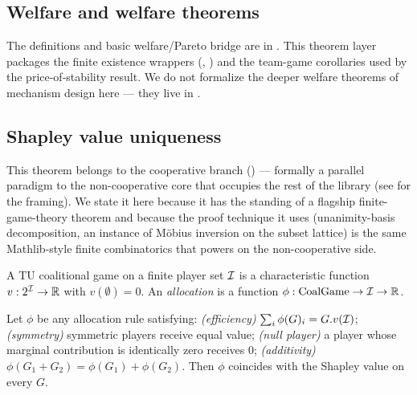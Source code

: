 \subsection{Welfare and welfare theorems}
\label{sec:theorems:welfare}

The definitions and basic welfare/Pareto bridge are in
.  This theorem layer packages
the finite existence wrappers
(, ) and the
team-game corollaries used by the price-of-stability result.  We do
not formalize the deeper welfare theorems of mechanism design here
— they live in .


\subsection{Shapley value uniqueness}
\label{sec:theorems:shapley-uniqueness}

This theorem belongs to the cooperative branch
() — formally a parallel
paradigm to the non-cooperative core that occupies the rest of
the library (see  for the framing).
We state it here because it has the standing of a flagship
finite-game-theory theorem and because the proof technique it
uses (unanimity-basis decomposition, an instance of Möbius
inversion on the subset lattice) is the same Mathlib-style finite
combinatorics that powers 
on the non-cooperative side.

A TU coalitional game on a finite player set $\mathcal{I}$ is a
characteristic function $v : 2^{\mathcal{I}} \to \mathbb{R}$ with
$v(\emptyset) = 0$.  An \emph{allocation} is a function
$\phi : \mathrm{CoalGame} \to \mathcal{I} \to \mathbb{R}$.

\begin{theorem}
\label{thm:shapley-unique}
Let $\phi$ be any allocation rule satisfying:
\emph{(efficiency)} $\sum_i \phi(G)_i = G.v(\mathcal{I})$;
\emph{(symmetry)} symmetric players receive equal value;
\emph{(null player)} a player whose marginal contribution is
identically zero receives $0$;
\emph{(additivity)} $\phi(G_1 + G_2) = \phi(G_1) + \phi(G_2)$.
Then $\phi$ coincides with the Shapley value on every $G$.
\end{theorem}

